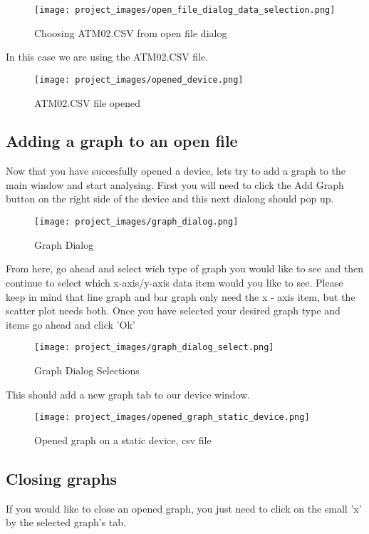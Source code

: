 \begin{figure}[H]
\centering
\texttt{[image: project\_images/open\_file\_dialog\_data\_selection.png]}
 \caption{Choosing ATM02.CSV from open file dialog}
 \label{fig:open file dialog data selection}
\end{figure}

	In this case we are using the ATM02.CSV file.

\begin{figure}[H]
\centering
\texttt{[image: project\_images/opened\_device.png]}
 \caption{ATM02.CSV file opened}
 \label{fig:opened atm02 csv file}
\end{figure}

\subsection{Adding a graph to an open file}
	Now that you have succesfully opened a device, lets try to add a graph to the main window and start analysing. First you will need to click the Add Graph button on the right side of the device and this next dialong should pop up.

\begin{figure}[H]
\centering
\texttt{[image: project\_images/graph\_dialog.png]}
 \caption{Graph Dialog}
 \label{fig:graph dialog}
\end{figure}

	From here, go ahead and select wich type of graph you would like to see and then continue to select which x-axis/y-axis data item would you like to see. Please keep in mind that line graph and bar graph only need the x - axis item, but the scatter plot needs both. Once you have selected your desired graph type and items go ahead and click 'Ok'

\begin{figure}[H]
\centering
\texttt{[image: project\_images/graph\_dialog\_select.png]}
 \caption{Graph Dialog Selections}
 \label{fig:graph dialog selections}
\end{figure}

	This should add a new graph tab to our device window.

\begin{figure}[H]
\centering
\texttt{[image: project\_images/opened\_graph\_static\_device.png]}
 \caption{Opened graph on a static device, csv file}
 \label{fig:opened graph on static device}
\end{figure}

\subsection{Closing graphs}
	If you would like to close an opened graph, you just need to click on the small 'x' by the selected graph's tab.

